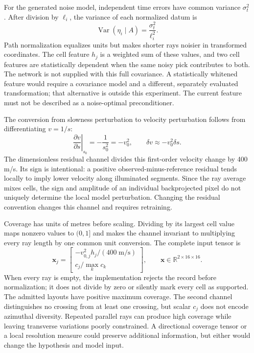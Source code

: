\documentclass[11pt]{article}
\begin{document}
For the generated noise model, independent time errors have common variance $\sigma_t^2$. After division by $\ell_i$, the variance of each normalized datum is
\begin{equation}
\operatorname{Var}(\eta_i\mid A)=\frac{\sigma_t^2}{\ell_i^2}.
\label{eq:normalized-noise}
\end{equation}
Path normalization equalizes units but makes shorter rays noisier in transformed coordinates. The cell feature $h_j$ is a weighted sum of these values, and two cell features are statistically dependent when the same noisy pick contributes to both. The network is not supplied with this full covariance. A statistically whitened feature would require a covariance model and a different, separately evaluated transformation; that alternative is outside this experiment. The current feature must not be described as a noise-optimal preconditioner.

The conversion from slowness perturbation to velocity perturbation follows from differentiating $v=1/s$:
\begin{equation}
\left.\frac{\partial v}{\partial s}\right|_{s_0}=-\frac{1}{s_0^2}=-v_0^2,
\qquad \delta v\approx -v_0^2\delta s.
\label{eq:velocity-linearization}
\end{equation}
The dimensionless residual channel divides this first-order velocity change by 400 m/s. Its sign is intentional: a positive observed-minus-reference residual tends locally to imply lower velocity along illuminated segments. Since the ray average mixes cells, the sign and amplitude of an individual backprojected pixel do not uniquely determine the local model perturbation. Changing the residual convention changes this channel and requires retraining.

Coverage has units of metres before scaling. Dividing by its largest cell value maps nonzero values to $(0,1]$ and makes the channel invariant to multiplying every ray length by one common unit conversion. The complete input tensor is
\begin{equation}
\mathbf{x}_{j}=\begin{bmatrix}-v_{0,j}^{2}h_j/(400\;\mathrm{m/s})\\c_j/\max_k c_k\end{bmatrix},\qquad \mathbf{x}\in\mathbb{R}^{2\times16\times16}.
\label{eq:input-tensor}
\end{equation}
When every ray is empty, the implementation rejects the record before normalization; it does not divide by zero or silently mark every cell as supported. The admitted layouts have positive maximum coverage. The second channel distinguishes no crossing from at least one crossing, but scalar $c_j$ does not encode azimuthal diversity. Repeated parallel rays can produce high coverage while leaving transverse variations poorly constrained. A directional coverage tensor or a local resolution measure could preserve additional information, but either would change the hypothesis and model input.
\end{document}
